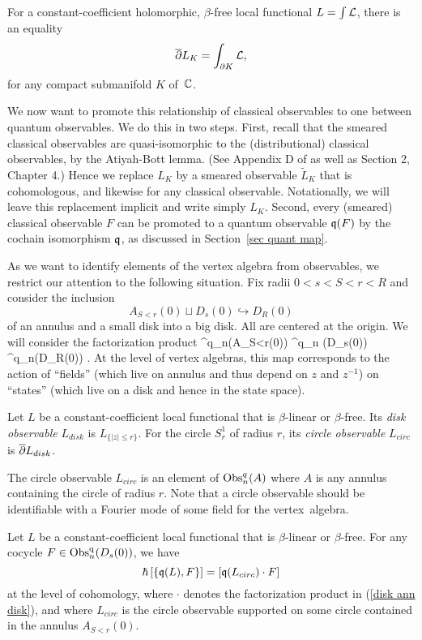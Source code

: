 \begin{lemma}
For a constant-coefficient holomorphic, $\beta$-free local functional $L = \int \mathcal L$,
there is an equality
\[
\overline{\partial} L_K = \int_{\partial K} \mathcal L,
\]
for any compact submanifold $K$ of~$\mathbb C$.
\end{lemma}

We now want to promote this relationship of classical observables to one between quantum observables.
We do this in two steps.
First, recall that the smeared classical observables are quasi-isomorphic to the (distributional) classical observables,
by the Atiyah-Bott lemma. (See Appendix D of \cite{CG1} as well as Section 2, Chapter 4.)
Hence we replace $L_K$ by a smeared observable $\widetilde{L}_K$ that is cohomologous, and likewise for any classical observable.
Notationally, we will leave this replacement implicit and write simply $L_K$.
Second, every (smeared) classical observable $F$ can be promoted to a quantum observable $\frak{q}(F)$ 
by the cochain isomorphism $\frak{q}$, as discussed in Section~\ref{sec quant map}.

As we want to identify elements of the vertex algebra from observables,
we restrict our attention to the following situation.
Fix radii $0 < s < S < r <R$ and
consider the inclusion 
\[
A_{S<r}(0) \sqcup D_s(0) \hookrightarrow D_R(0)
\]
of an annulus and a small disk into a big disk.
All are centered at the origin. We will consider the factorization product 
\be\label{disk ann disk}
\Obs^q_n(A_{S<r}(0)) \tensor \Obs^q_n (D_s(0)) \to \Obs^q_n(D_R(0)) .
\ee
At the level of vertex algebras, this map corresponds to the action of ``fields'' (which live on annulus and thus depend on $z$ and $z^{-1}$) on ``states'' (which live on a disk and hence in the state space).

\begin{dfn}
Let $L$ be a constant-coefficient local functional that is $\beta$-linear or $\beta$-free.
Its {\em disk observable} $L_{disk}$ is $L_{\{|z| \leq r\}}$. For the circle $S^1_r$ of radius $r$, its {\em circle observable} $L_{circ}$ is $\overline{\partial} L_{disk}$.
\end{dfn}

The circle observable $L_{circ}$ is an element of ${\rm Obs}^q_{n}(A)$ where $A$ is any annulus containing the circle of radius $r$. Note that a circle observable should be identifiable with a Fourier mode of some field for the vertex~algebra.

\begin{lemma}
\label{der vs star}
Let $L$ be a constant-coefficient local functional that is $\beta$-linear or $\beta$-free.
For any cocycle $F \in {\rm Obs}^{\rm q}_n(D_s(0))$, we have
\[
\hbar \left[ \{\frak{q}(L) , F\} \right] = \left[\frak{q}(L_{circ}) \cdot F\right]
\]
at the level of cohomology, where $\cdot$ denotes the factorization product in (\ref{disk ann disk}), and where $L_{circ}$ is the circle observable supported on some circle contained in the annulus $A_{S<r}(0)$.
\end{lemma}

